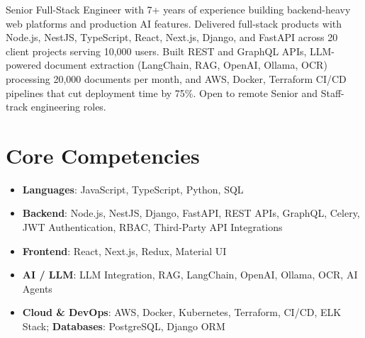 \documentclass[11pt,a4paper,sans]{moderncv}
\begin{document}
\makecvtitle

\vspace{6pt}
\small{Senior Full-Stack Engineer with 7+ years of experience building backend-heavy web platforms and production AI features. Delivered full-stack products with Node.js, NestJS, TypeScript, React, Next.js, Django, and FastAPI across 20 client projects serving 10,000 users. Built REST and GraphQL APIs, LLM-powered document extraction (LangChain, RAG, OpenAI, Ollama, OCR) processing 20,000 documents per month, and AWS, Docker, Terraform CI/CD pipelines that cut deployment time by 75\%. Open to remote Senior and Staff-track engineering roles.}

\section{Core Competencies}
\vspace{1pt}
\begin{itemize}

\item \textbf{Languages}: JavaScript, TypeScript, Python, SQL

\item \textbf{Backend}: Node.js, NestJS, Django, FastAPI, REST APIs, GraphQL, Celery, JWT Authentication, RBAC, Third-Party API Integrations

\item \textbf{Frontend}: React, Next.js, Redux, Material UI

\item \textbf{AI / LLM}: LLM Integration, RAG, LangChain, OpenAI, Ollama, OCR, AI Agents

\item \textbf{Cloud \& DevOps}: AWS, Docker, Kubernetes, Terraform, CI/CD, ELK Stack; \textbf{Databases}: PostgreSQL, Django ORM

\end{itemize}
\end{document}
